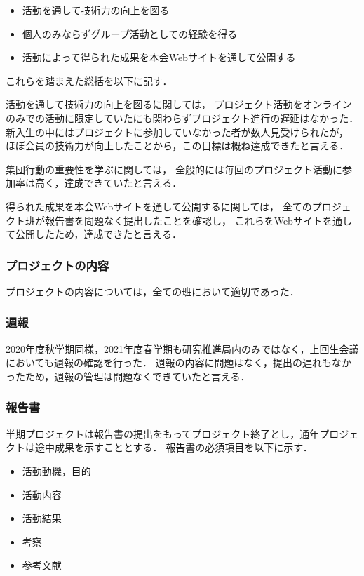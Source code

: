 \begin{itemize}
  \item 活動を通して技術力の向上を図る
  \item 個人のみならずグループ活動としての経験を得る
  \item 活動によって得られた成果を本会Webサイトを通して公開する
\end{itemize}

これらを踏まえた総括を以下に記す．

活動を通して技術力の向上を図るに関しては，
プロジェクト活動をオンラインのみでの活動に限定していたにも関わらずプロジェクト進行の遅延はなかった．
新入生の中にはプロジェクトに参加していなかった者が数人見受けられたが，
ほぼ会員の技術力が向上したことから，この目標は概ね達成できたと言える．

集団行動の重要性を学ぶに関しては，
全般的には毎回のプロジェクト活動に参加率は高く，達成できていたと言える．

得られた成果を本会Webサイトを通して公開するに関しては，
全てのプロジェクト班が報告書を問題なく提出したことを確認し，
これらをWebサイトを通して公開したため，達成できたと言える．

\subsubsection*{プロジェクトの内容}
プロジェクトの内容については，全ての班において適切であった．

\subsubsection*{週報}
2020年度秋学期同様，2021年度春学期も研究推進局内のみではなく，上回生会議においても週報の確認を行った．
週報の内容に問題はなく，提出の遅れもなかったため，週報の管理は問題なくできていたと言える．

\subsubsection*{報告書}
半期プロジェクトは報告書の提出をもってプロジェクト終了とし，通年プロジェクトは途中成果を示すこととする．
報告書の必須項目を以下に示す．

\begin{itemize}
  \item 活動動機，目的
  \item 活動内容
  \item 活動結果
  \item 考察
  \item 参考文献
\end{itemize}

